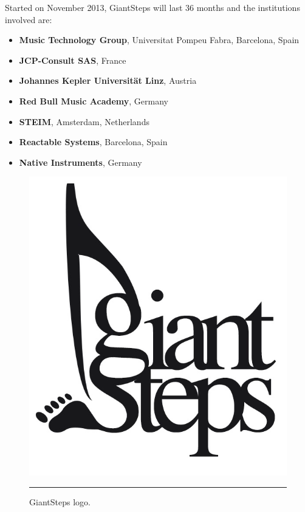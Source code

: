 Started on November 2013, GiantSteps will last 36 months and the institutions involved are:
\begin{itemize}
\item \textbf{Music Technology Group}, Universitat Pompeu Fabra, Barcelona, Spain
\item \textbf{JCP-Consult SAS}, France
\item \textbf{Johannes Kepler Universität Linz}, Austria
\item \textbf{Red Bull Music Academy}, Germany
\item \textbf{STEIM}, Amsterdam, Netherlands
\item \textbf{Reactable Systems}, Barcelona, Spain
\item \textbf{Native Instruments}, Germany
\end{itemize}

\begin{figure}[htbp]
  \centering
    \includegraphics{Figures/giantsteps.png}
    \rule{25em}{0.5pt}
  \caption[GiantSteps]{GiantSteps logo.}
  \label{fig:GiantSteps}
\end{figure}


